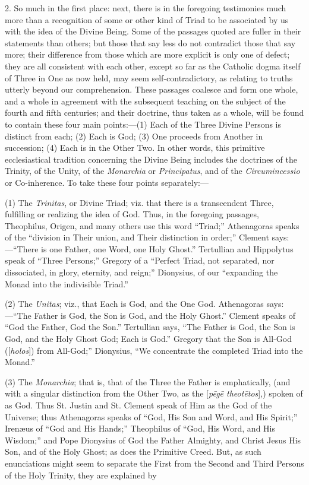 2. So much in the first place: next, there is in the foregoing
testimonies much more than a recognition of some or other kind of
Triad to be associated by us with the idea of the Divine Being. Some
of the passages quoted are fuller in their statements than others; but
those that say less do not contradict those that say more; their
difference from those which are more explicit is only one of defect;
they are all consistent with each other, except so far as the Catholic
dogma itself of Three in One as now held, may seem self-contradictory,
as relating to truths utterly beyond our comprehension. These
passages coalesce and form one whole, and a whole in agreement with
the subsequent teaching on the subject of the fourth and fifth
centuries; and their doctrine, thus taken as a whole, will be found to
contain these four main points:—(1) Each of the Three Divine Persons
is distinct from each; (2) Each is God; (3) One proceeds from Another
in succession; (4) Each is in the Other Two. In other words, this
primitive ecclesiastical tradition concerning the Divine Being
includes the doctrines of the Trinity, of the Unity, of the \emph{Monarchia}
or \emph{Principatus}, and of the \emph{Circumincessio} or
Co-inherence. To take these four points separately:—

(1) The \emph{Trinitas}, or Divine Triad; viz. that there is a
transcendent Three, fulfilling or realizing the idea of God. Thus, in
the foregoing passages, Theophilus, Origen, and many others use this
word ``Triad;'' Athenagoras speaks of the ``division in
Their union, and Their distinction in order;'' Clement says:—``There
is one Father, one Word, one Holy Ghost.'' Tertullian and
Hippolytus speak of ``Three Persons;'' Gregory of a
``Perfect Triad, not separated, nor dissociated, in glory,
eternity, and reign;'' Dionysius, of our ``expanding the Monad
into the indivisible Triad.''

(2) The \emph{Unitas}; viz., that Each is God, and the One God.
Athenagoras says:—``The Father is God, the Son is God, and the
Holy Ghost.'' Clement speaks of ``God the Father, God the
Son.'' Tertullian says, ``The Father is God, the Son is God,
and the Holy Ghost God; Each is God.'' Gregory that the Son is
All-God ([\emph{holos}]) from All-God;'' Dionysius, ``We
concentrate the completed Triad into the Monad.''

(3) The \emph{Monarchia}; that is, that of the Three the Father is
emphatically, (and with a singular distinction from the Other Two, as
the [\emph{p\={e}g\={e} theot\={e}tos}],) spoken of as God.
Thus St. Justin and St. Clement speak of Him as the God of the
Universe; thus Athenagoras speaks of ``God, His Son and Word, and
His Spirit;'' Irenæus of ``God and His Hands;''
Theophilus of ``God, His Word, and His Wisdom;'' and Pope
Dionysius of God the Father Almighty, and Christ Jesus His Son, and of
the Holy Ghost; as does the Primitive Creed. But, as such enunciations
might seem to separate the First from the Second and Third Persons of
the Holy Trinity, they are explained by

